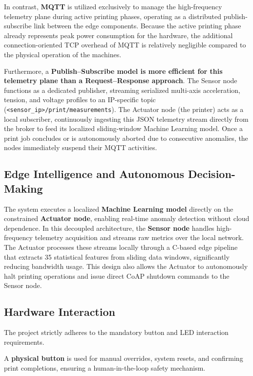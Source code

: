 In contrast, \textbf{MQTT} is utilized exclusively to manage the high-frequency telemetry plane during active printing phases, operating as a distributed publish-subscribe link between the edge components. Because the active printing phase already represents peak power consumption for the hardware, the additional connection-oriented TCP overhead of MQTT is relatively negligible compared to the physical operation of the machines. 

\newpage

Furthermore, a \textbf{Publish–Subscribe model is more efficient for this telemetry plane than a Request–Response approach}. The Sensor node functions as a dedicated publisher, streaming serialized multi-axis acceleration, tension, and voltage profiles to an IP-specific topic (\texttt{<sensor\_ip>/print/measurements}). The Actuator node (the printer) acts as a local subscriber, continuously ingesting this JSON telemetry stream directly from the broker to feed its localized sliding-window Machine Learning model. Once a print job concludes or is autonomously aborted due to consecutive anomalies, the nodes immediately suspend their MQTT activities.

\subsection{Edge Intelligence and Autonomous Decision-Making}
The system executes a localized \textbf{Machine Learning model} directly on the constrained \textbf{Actuator node}, enabling real-time anomaly detection without cloud dependence. In this decoupled architecture, the \textbf{Sensor node} handles high-frequency telemetry acquisition and streams raw metrics over the local network. The Actuator processes these streams locally through a C-based edge pipeline that extracts 35 statistical features from sliding data windows, significantly reducing bandwidth usage. This design also allows the Actuator to autonomously halt printing operations and issue direct CoAP shutdown commands to the Sensor node. 

\subsection{Hardware Interaction}
The project strictly adheres to the mandatory button and LED interaction requirements. 

A \textbf{physical button} is used for manual overrides, system resets, and confirming print completions, ensuring a human-in-the-loop safety mechanism. 

